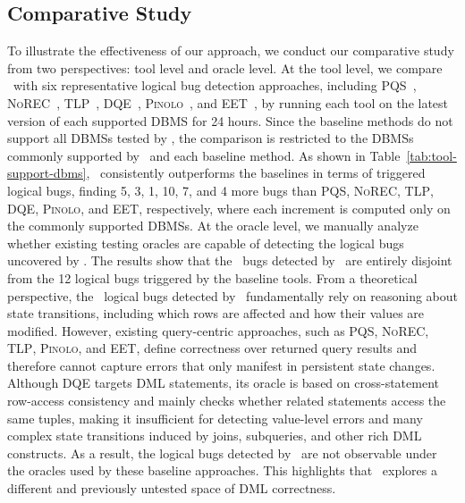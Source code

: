 \subsection{Comparative Study}
\label{sec:eval-compare}
To illustrate the effectiveness of our approach, we conduct our comparative study from two perspectives: tool level and oracle level. 
At the tool level, we compare \toolname\ with six representative logical bug detection approaches, including \textsc{PQS}~\cite{rigger2020testing}, \textsc{NoREC}~\cite{rigger2020detecting}, \textsc{TLP}~\cite{rigger2020finding}, \textsc{DQE}~\cite{song2023testing}, \textsc{Pinolo}~\cite{hao2023pinolo}, and \textsc{EET}~\cite{jiang2024detecting}, by running each tool on the latest version of each supported DBMS for 24 hours. 
Since the baseline methods do not support all DBMSs tested by \toolname, the comparison is restricted to the DBMSs commonly supported by \toolname\ and each baseline method. 
As shown in Table~\ref{tab:tool-support-dbms}, \toolname\ consistently outperforms the baselines in terms of triggered logical bugs, finding 5, 3, 1, 10, 7, and 4 more bugs than \textsc{PQS}, \textsc{NoREC}, \textsc{TLP}, \textsc{DQE}, \textsc{Pinolo}, and \textsc{EET}, respectively, where each increment is computed only on the commonly supported DBMSs. 
%
At the oracle level, we manually analyze whether existing testing oracles are capable of detecting the logical bugs uncovered by \toolname. 
The results show that the \logical\ bugs detected by \toolname\ are entirely disjoint from the 12 logical bugs triggered by the baseline tools.
From a theoretical perspective, the \logical\ logical bugs detected by \toolname\ fundamentally rely on reasoning about state transitions, including which rows are affected and how their values are modified. 
However, existing query-centric approaches, such as \textsc{PQS}, \textsc{NoREC}, \textsc{TLP}, \textsc{Pinolo}, and \textsc{EET}, define correctness over returned query results and therefore cannot capture errors that only manifest in persistent state changes. 
Although \textsc{DQE} targets DML statements, its oracle is based on cross-statement row-access consistency and mainly checks whether related statements access the same tuples, making it insufficient for detecting value-level errors and many complex state transitions induced by joins, subqueries, and other rich DML constructs. 
As a result, the logical bugs detected by \toolname\ are not observable under the oracles used by these baseline approaches. 
This highlights that \toolname\ explores a different and previously untested space of DML correctness.
